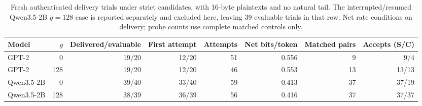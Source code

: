 \begin{table}[t]
\centering
\caption{Fresh authenticated delivery trials under strict candidates, with 16-byte plaintexts and no natural tail. The interrupted/resumed Qwen3.5-2B $g=128$ case is reported separately and excluded here, leaving 39 evaluable trials in that row. Net rate conditions on delivery; probe counts use complete matched controls only.}
\label{tab:repair-matrix}
\begin{tabular}{lrrrrrrr}
\toprule
Model & $g$ & Delivered/evaluable & First attempt & Attempts & Net bits/token & Matched pairs & Accepts (S/C) \\
\midrule
GPT-2 & 0 & 19/20 & 12/20 & 51 & 0.556 & 9 & 9/4 \\
GPT-2 & 128 & 19/20 & 12/20 & 46 & 0.553 & 13 & 13/13 \\
Qwen3.5-2B & 0 & 39/40 & 33/40 & 59 & 0.413 & 37 & 37/19 \\
Qwen3.5-2B & 128 & 38/39 & 36/39 & 56 & 0.416 & 37 & 37/37 \\
\bottomrule
\end{tabular}
\end{table}
